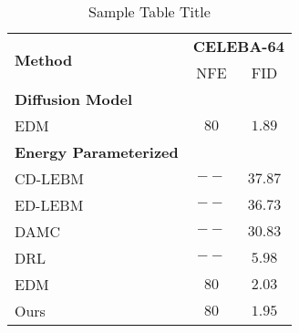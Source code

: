 \begin{table}[h]
\caption{Sample Table Title} \label{sample-table}
\begin{tabular}{lcc}
\toprule
\multirow{2}{*}{\textbf{Method}} & \multicolumn{2}{c}{\textbf{CELEBA-64}} \\
 & NFE & FID  \\
\cmidrule{2-3}
\textbf{Diffusion Model} \\
EDM  & $80$   & $1.89$     \\
\cmidrule{2-3}
\textbf{Energy Parameterized} \\
CD-LEBM  & $--$   & $37.87$  \\
ED-LEBM  & $--$   & $36.73$  \\
DAMC  & $--$   & $30.83$  \\
DRL  & $--$   & $5.98$  \\
EDM  & $80$   & $2.03$  \\
Ours          & $80$  & $1.95$   \\
\bottomrule
\end{tabular}
\end{table}
